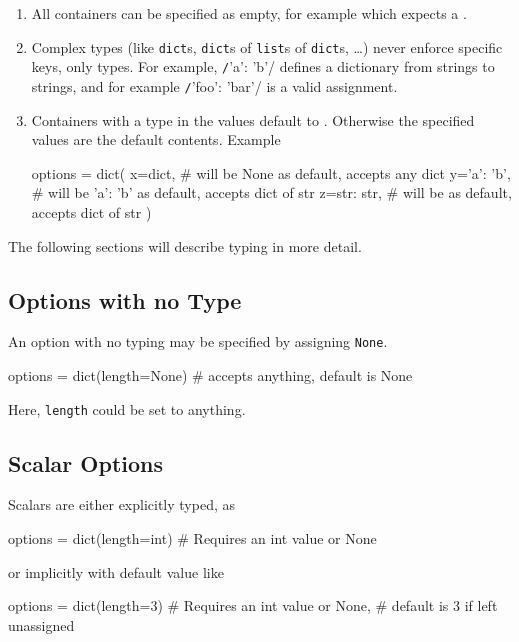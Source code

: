 \begin{enumerate}
\item All containers can be specified as empty, for example
  \py{{}} which expects a .

\item Complex types (like \texttt{dict}s, \texttt{dict}s of
  \texttt{list}s of \texttt{dict}s, \dots) never enforce specific
  keys, only types.  For example, \texttt/{'a': 'b'}/
  defines a dictionary from strings to strings, and for example
  \texttt/{'foo': 'bar'}/ is a valid
  assignment.

\item Containers with a type in the values default to \pyNone.
  Otherwise the specified values are the default contents.  Example
  \begin{python}
options = dict(
    x=dict,        # will be None as default, accepts any dict
    y={'a': 'b'},  # will be {'a': 'b'} as default, accepts dict of str
    z={str: str},  # will be {} as default, accepts dict of str
)
  \end{python}
\end{enumerate}

The following sections will describe typing in more detail.



\subsection{Options with no Type}
An option with no typing may be specified by assigning \texttt{None}.
\begin{python}
options = dict(length=None)  # accepts anything, default is None
\end{python}
Here, \texttt{length} could be set to anything.



\subsection{Scalar Options}
Scalars are either explicitly typed, as
\begin{python}
options = dict(length=int)   # Requires an int value or None
\end{python}
or implicitly with default value like
\begin{python}
options = dict(length=3)     # Requires an int value or None,
                             # default is 3 if left unassigned
\end{python}



